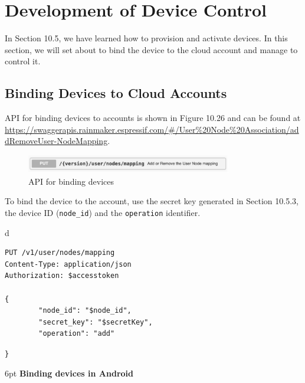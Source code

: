 \documentclass[a4paper,12pt,openany]{book}
\renewcommand{\ttfamily}{\fontfamily{pcr}\selectfont}
\renewcommand{\arraystretch}{1}
\newenvironment{codebloc}{ %
    \ttfamily\footnotesize
    \renewcommand{\arraystretch}{1}
}
\newcommand{\note}[2][NOTE]{ %
\vspace{6pt}
\begin{tabular}{b{\textwidth}}
\hline
\fontfamily{phv}\selectfont \textbf{#1}\\
\leftskip 1em #2\\
\hline
\end{tabular}
}
\begin{document}
\section{Development of Device Control}
In Section 10.5, we have learned how to provision and activate devices. In this section, we will set about to bind the device to the cloud account and manage to control it.

\subsection{Binding Devices to Cloud Accounts}
API for binding devices to accounts is shown in Figure 10.26 and can be found at \href{https://swaggerapis.rainmaker.espressif.com/#/User%20Node%20Association/addRemoveUserNodeMapping}{https://\newline swaggerapis.rainmaker.espressif.com/\#/User\%20Node\%20Association/addRemoveUser-\newline NodeMapping}.

\begin{figure}[ht]
    \centering
    \includegraphics[width=0.8\textwidth]{D10Z/10-26}
    \caption{API for binding devices}
\end{figure}

To bind the device to the account, use the secret key generated in Section 10.5.3, the device ID (\verb|node_id|) and the \verb|operation| identifier.

\begin{codebloc}
\begin{tabular}{d}
\vspace{2pt}
\begin{verbatim}
PUT /v1/user/nodes/mapping
Content-Type: application/json
Authorization: $accesstoken

{
        "node_id": "$node_id",
        "secret_key": "$secretKey",
        "operation": "add"
\end{verbatim}
\verb|}|
\end{tabular}
\end{codebloc}

\vspace{6pt}
\textbf{Binding devices in Android}

\end{document}
